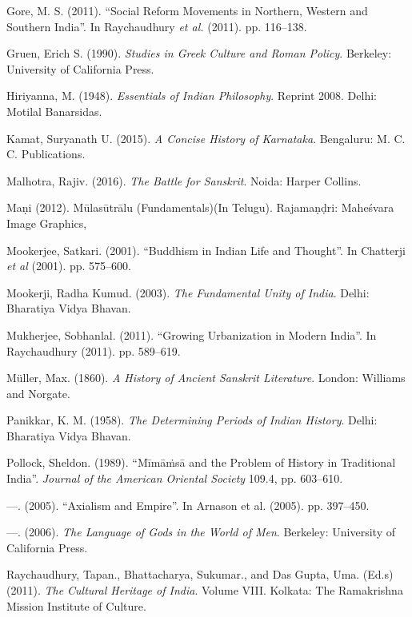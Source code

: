 \begin{thebibliography}{99}
  Gore, M. S. (2011). “Social Reform Movements in Northern, Western and Southern India”. In Raychaudhury \textit{et al.} (2011). pp. 116–138.

  Gruen, Erich S. (1990). \textit{Studies in Greek Culture and Roman Policy}. Berkeley: University of California Press.

  Hiriyanna, M. (1948). \textit{Essentials of Indian Philosophy}. Reprint 2008. Delhi: Motilal Banarsidas.

  Kamat, Suryanath U. (2015). \textit{A Concise History of Karnataka}. Bengaluru: M. C. C. Publications.

  Malhotra, Rajiv. (2016). \textit{The Battle for Sanskrit}. Noida: Harper Collins.

  Maṇi (2012). Mūlasūtrālu (Fundamentals)(In Telugu). Rajamaṇḍri: Maheśvara Image Graphics,

  Mookerjee, Satkari. (2001). “Buddhism in Indian Life and Thought”. In Chatterji \textit{et al} (2001). pp. 575–600.

  Mookerji, Radha Kumud. (2003). \textit{The Fundamental Unity of India}. Delhi: Bharatiya Vidya Bhavan.

  Mukherjee, Sobhanlal. (2011). “Growing Urbanization in Modern India”. In Raychaudhury (2011). pp. 589–619.

  Müller, Max. (1860). \textit{A History of Ancient Sanskrit Literature}. London: Williams and Norgate.

  Panikkar, K. M. (1958). \textit{The Determining Periods of Indian History}. Delhi: Bharatiya Vidya Bhavan.

  Pollock, Sheldon. (1989). “Mīmāṁsā and the Problem of History in Traditional India”. \textit{Journal of the American Oriental Society} 109.4, pp. 603–610.

  —. (2005). “Axialism and Empire”. In Arnason et al. (2005). pp. 397–450.

  —. (2006). \textit{The Language of Gods in the World of Men}. Berkeley: University of California Press.

  Raychaudhury, Tapan., Bhattacharya, Sukumar., and Das Gupta, Uma. (Ed.s) (2011). \textit{The Cultural Heritage of India}. Volume VIII. Kolkata: The Ramakrishna Mission Institute of Culture.


\end{thebibliography}
